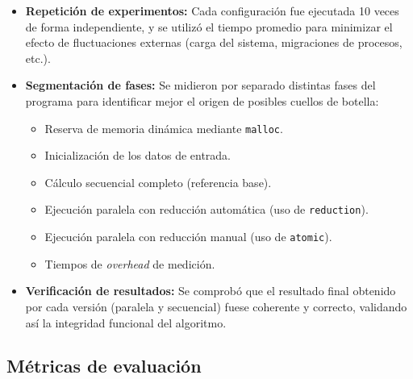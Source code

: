         \begin{itemize}
        
            \item \textbf{Repetición de experimentos:} Cada configuración fue ejecutada 10 veces de forma independiente, y se utilizó el tiempo promedio para minimizar el efecto de fluctuaciones externas (carga del sistema, migraciones de procesos, etc.).
            
            \item \textbf{Segmentación de fases:} Se midieron por separado distintas fases del programa para identificar mejor el origen de posibles cuellos de botella:
            
                \begin{itemize}
                    \item Reserva de memoria dinámica mediante \texttt{malloc}.
                    
                    \item Inicialización de los datos de entrada.
                    
                    \item Cálculo secuencial completo (referencia base).
                    
                    \item Ejecución paralela con reducción automática (uso de \texttt{reduction}).
                    
                    \item Ejecución paralela con reducción manual (uso de \texttt{atomic}).

                    \item Tiempos de \textit{overhead} de medición.
                    
                \end{itemize}
            
            \item \textbf{Verificación de resultados:} Se comprobó que el resultado final obtenido por cada versión (paralela y secuencial) fuese coherente y correcto, validando así la integridad funcional del algoritmo.
            
        \end{itemize}

    \subsection{Métricas de evaluación}
        
